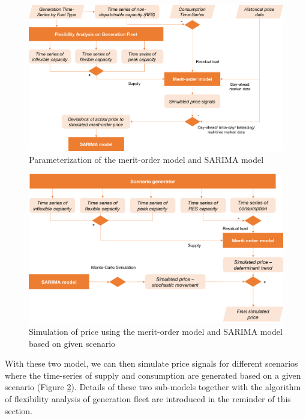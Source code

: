 \begin{figure}[h!]
	\centering
	\includegraphics[width=0.95\linewidth]{Figures/MarketSimulationParameterization}
	\caption{Parameterization of the merit-order model and SARIMA model}
	\label{fig:ms-parameterization}
\end{figure}


\begin{figure}[h!]
	\centering
	\includegraphics[width=0.95\linewidth]{Figures/MarketSimulationSimulation}
	\caption{Simulation of price using the merit-order model and SARIMA model based on given scenario}
	\label{fig:ms-simulation}
\end{figure}

With these two model, we can then simulate price signals for different scenarios where the time-series of supply and consumption are generated based on a given scenario (Figure \ref{fig:ms-simulation}). Details of these two sub-models together with the algorithm of flexibility analysis of generation fleet are introduced in the reminder of this section.


